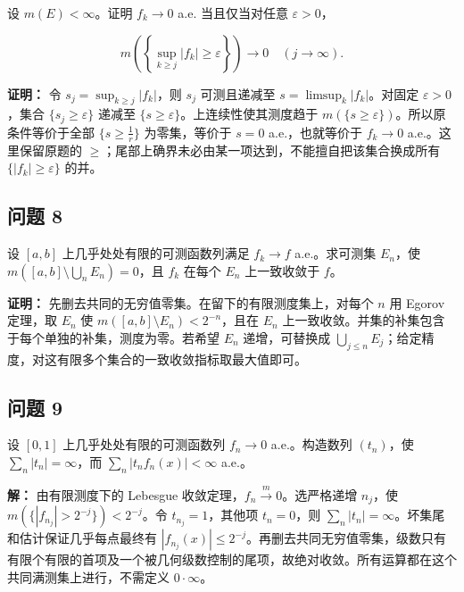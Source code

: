 \documentclass[11pt,a4paper]{article}
\begin{document}
设 \(m(E)<\infty\)。证明 \(f_k\to0\) a.e. 当且仅当对任意
\(\varepsilon>0\)，

\begin{equation*}m\!\left(\left\{\sup_{k\ge j}|f_k|\ge\varepsilon\right\}\right)\longrightarrow0\quad(j\to\infty).\end{equation*}

\textbf{证明：} 令 \(s_j=\sup_{k\ge j}|f_k|\)，则 \(s_j\) 可测且递减至
\(s=\limsup_k|f_k|\)。对固定 \(\varepsilon>0\)，集合
\(\{s_j\ge\varepsilon\}\) 递减至
\(\{s\ge\varepsilon\}\)。上连续性使其测度趋于
\(m(\{s\ge\varepsilon\})\)。所以原条件等价于全部 \(\{s\ge\frac1r\}\)
为零集，等价于 \(s=0\) a.e.，也就等价于 \(f_k\to0\) a.e.。这里保留原题的
\(\ge\)；尾部上确界未必由某一项达到，不能擅自把该集合换成所有
\(\{|f_k|\ge\varepsilon\}\) 的并。

\subsection{问题 8}\label{ux95eeux9898-8}

设 \([a,b]\) 上几乎处处有限的可测函数列满足 \(f_k\to f\) a.e.。求可测集
\(E_n\)，使 \(m([a,b]\setminus\bigcup_nE_n)=0\)，且 \(f_k\) 在每个
\(E_n\) 上一致收敛于 \(f\)。

\textbf{证明：} 先删去共同的无穷值零集。在留下的有限测度集上，对每个
\(n\) 用 Egorov 定理，取 \(E_n\) 使
\(m([a,b]\setminus E_n)<2^{-n}\)，且在 \(E_n\)
上一致收敛。并集的补集包含于每个单独的补集，测度为零。若希望 \(E_n\)
递增，可替换成
\(\bigcup_{j\le n}E_j\)；给定精度，对这有限多个集合的一致收敛指标取最大值即可。

\subsection{问题 9}\label{ux95eeux9898-9}

设 \([0,1]\) 上几乎处处有限的可测函数列 \(f_n\to0\) a.e.。构造数列
\((t_n)\)，使 \(\sum_n|t_n|=\infty\)，而 \(\sum_n|t_nf_n(x)|<\infty\)
a.e.。

\textbf{解：} 由有限测度下的 Lebesgue
收敛定理，\(f_n\xrightarrow{m}0\)。选严格递增 \(n_j\)，使
\(m(\{|f_{n_j}|>2^{-j}\})<2^{-j}\)。令 \(t_{n_j}=1\)，其他项
\(t_n=0\)，则 \(\sum_n|t_n|=\infty\)。坏集尾和估计保证几乎每点最终有
\(|f_{n_j}(x)|\le2^{-j}\)。再删去共同无穷值零集，级数只有有限个有限的首项及一个被几何级数控制的尾项，故绝对收敛。所有运算都在这个共同满测集上进行，不需定义
\(0\cdot\infty\)。
\end{document}
